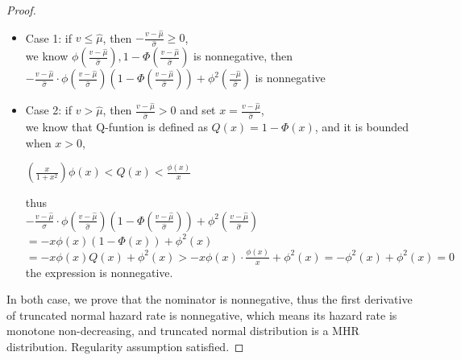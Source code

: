 \begin{proof}
\begin{itemize}
	\item Case 1: if $v \leqslant \hat{\mu}$, then $-\frac{v-\hat{\mu}}{\hat{\sigma}} \geqslant 0$,\\ we know $\phi(\frac{v-\hat{\mu}}{\hat{\sigma}}), 1-\Phi(\frac{v-\hat{\mu}}{\hat{\sigma}})$ is nonnegative, then $-\frac{v-\hat{\mu}}{\hat{\sigma}}\cdot \phi(\frac{v-\hat{\mu}}{\hat{\sigma}})(1 - \Phi(\frac{v-\hat{\mu}}{\hat{\sigma}})) + \phi^2(\frac{-\hat{\mu}}{\hat{\sigma}})$ is nonnegative
	\item Case 2: if  $v > \hat{\mu}$, then $\frac{v-\hat{\mu}}{\hat{\sigma}} > 0$ and set $x = \frac{v-\hat{\mu}}{\hat{\sigma}}$,\\
	 we know that Q-funtion is defined as $Q(x) = 1- \Phi(x)$, and it is bounded when $x > 0$,\begin{center}
	 	$\left( \frac{x}{1+x^2} \right)\phi(x) < Q(x) <\frac{\phi(x)}{x}$
	 \end{center}  thus \\ $-\frac{v-\hat{\mu}}{\sigma}\cdot \phi(\frac{v-\hat{\mu}}{\hat{\sigma}})(1 - \Phi(\frac{v-\hat{\mu}}{\hat{\sigma}})) + \phi^2(\frac{v-\hat{\mu}}{\hat{\sigma}})$ \vspace{2mm} \\$= -x\phi(x)(1-\Phi(x)) + \phi^2(x)$\vspace{2mm}\\$=-x\phi(x)Q(x) + \phi^2(x) > -x\phi(x)\cdot \frac{\phi(x)}{x} + \phi^2(x)  = -\phi^2(x) + \phi^2(x) = 0$\\ the expression is nonnegative.
\end{itemize}
 In both case, we prove that the nominator is nonnegative, thus the first derivative of truncated normal hazard rate is nonnegative, which means its hazard rate is monotone non-decreasing, and truncated normal distribution is a MHR distribution. Regularity assumption satisfied.
\end{proof}
